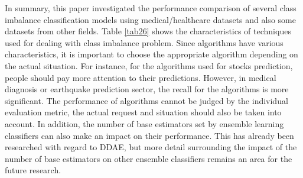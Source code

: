 In summary, this paper investigated the performance comparison of several class imbalance classification models using medical/healthcare datasets and also some datasets from other fields.  Table \ref{tab26} shows the characteristics of techniques used for dealing with class imbalance problem. Since algorithms have various characteristics, it is important to choose the appropriate algorithm depending on the actual situation. For instance, for the algorithms used for stocks prediction, people should pay more attention to their predictions. However, in medical diagnosis or earthquake prediction sector, the recall for the algorithms is more significant. The performance of algorithms cannot be judged by the individual evaluation metric, the actual request and situation should also be taken into account.
In addition, the number of base estimators set by ensemble learning classifiers can also make an impact on their performance. This has already been researched with regard to DDAE, but more detail surrounding the impact of the number of base estimators on other ensemble classifiers remains an area for the future research.
